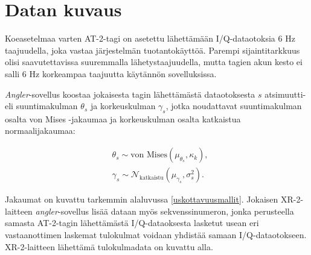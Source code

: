 \documentclass[
  12pt,
  a4paper, twoside]{book}
\begin{document}
\section{Datan kuvaus} \label{datan-kuvaus}

Koeasetelmaa varten AT-2-tagi on asetettu lähettämään I/Q-dataotoksia 6 Hz taajuudella, joka vastaa järjestelmän tuotantokäyttöä. Parempi sijaintitarkkuus olisi saavutettavissa suuremmalla lähetystaajuudella, mutta tagien akun kesto ei salli 6 Hz korkeampaa taajuutta käytännön sovelluksissa.

\emph{Angler}-sovellus koostaa jokaisesta tagin lähettämästä dataotoksesta \(s\) atsimuutti- eli suuntimakulman \(\theta_s\) ja korkeuskulman \(\gamma_s\), jotka noudattavat suuntimakulman osalta von Mises -jakaumaa ja korkeuskulman osalta katkaistua normaalijakaumaa:

\begin{align}
&\theta_{s} \sim \text{von Mises}(\mu_{\theta_s}, \kappa_k),\\
&\gamma_{s} \sim \mathcal{N}_{\text{katkaistu}} (\mu_{\gamma_s}, \sigma^2_s).
\end{align}

Jakaumat on kuvattu tarkemmin alaluvussa \ref{uskottavuusmallit}. Jokaisen XR-2-laitteen \emph{angler}-sovellus lisää dataan myös sekvenssinumeron, jonka perusteella samasta AT-2-tagin lähettämästä I/Q-dataoksesta lasketut usean eri vastaanottimen laskemat tulokulmat voidaan yhdistää samaan I/Q-dataotokseen. XR-2-laitteen lähettämä tulokulmadata on kuvattu alla.
\end{document}
